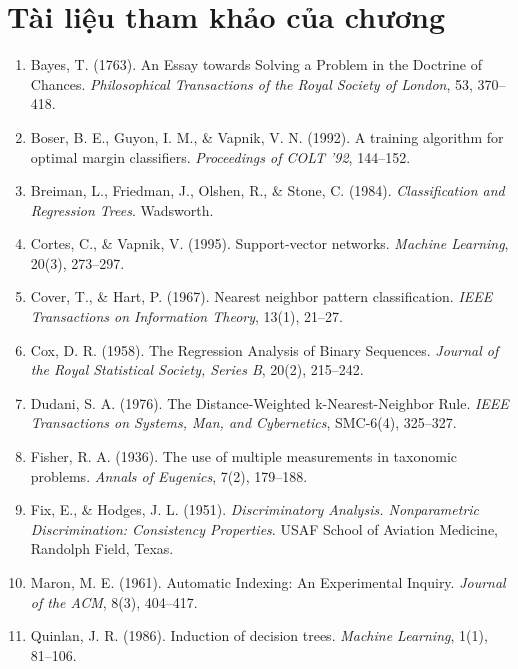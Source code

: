 \section*{Tài liệu tham khảo của chương}
\begin{enumerate}
    \item Bayes, T. (1763). An Essay towards Solving a Problem in the Doctrine of Chances. \textit{Philosophical Transactions of the Royal Society of London}, 53, 370--418.
    \item Boser, B. E., Guyon, I. M., \& Vapnik, V. N. (1992). A training algorithm for optimal margin classifiers. \textit{Proceedings of COLT '92}, 144--152.
    \item Breiman, L., Friedman, J., Olshen, R., \& Stone, C. (1984). \textit{Classification and Regression Trees}. Wadsworth.
    \item Cortes, C., \& Vapnik, V. (1995). Support-vector networks. \textit{Machine Learning}, 20(3), 273--297.
    \item Cover, T., \& Hart, P. (1967). Nearest neighbor pattern classification. \textit{IEEE Transactions on Information Theory}, 13(1), 21--27.
    \item Cox, D. R. (1958). The Regression Analysis of Binary Sequences. \textit{Journal of the Royal Statistical Society, Series B}, 20(2), 215--242.
    \item Dudani, S. A. (1976). The Distance-Weighted k-Nearest-Neighbor Rule. \textit{IEEE Transactions on Systems, Man, and Cybernetics}, SMC-6(4), 325--327.
    \item Fisher, R. A. (1936). The use of multiple measurements in taxonomic problems. \textit{Annals of Eugenics}, 7(2), 179--188.
    \item Fix, E., \& Hodges, J. L. (1951). \textit{Discriminatory Analysis. Nonparametric Discrimination: Consistency Properties}. USAF School of Aviation Medicine, Randolph Field, Texas.
    \item Maron, M. E. (1961). Automatic Indexing: An Experimental Inquiry. \textit{Journal of the ACM}, 8(3), 404--417.
    \item Quinlan, J. R. (1986). Induction of decision trees. \textit{Machine Learning}, 1(1), 81--106.
\end{enumerate}

